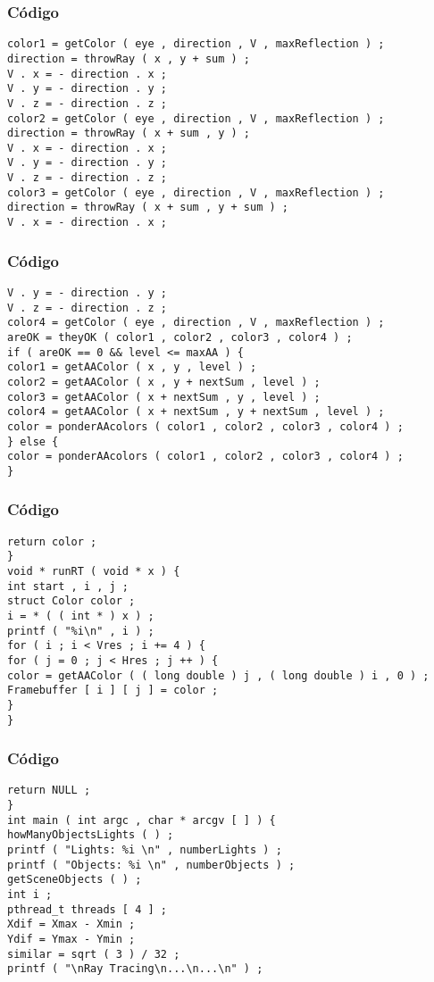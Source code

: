 \documentclass{beamer}
\begin{document}
\begin{frame}[fragile]
\frametitle{C\'odigo}
\begin{verbatim}
color1 = getColor ( eye , direction , V , maxReflection ) ; 
direction = throwRay ( x , y + sum ) ; 
V . x = - direction . x ; 
V . y = - direction . y ; 
V . z = - direction . z ; 
color2 = getColor ( eye , direction , V , maxReflection ) ; 
direction = throwRay ( x + sum , y ) ; 
V . x = - direction . x ; 
V . y = - direction . y ; 
V . z = - direction . z ; 
color3 = getColor ( eye , direction , V , maxReflection ) ; 
direction = throwRay ( x + sum , y + sum ) ; 
V . x = - direction . x ; 
\end{verbatim}
\end{frame}
\begin{frame}[fragile]
\frametitle{C\'odigo}
\begin{verbatim}
V . y = - direction . y ; 
V . z = - direction . z ; 
color4 = getColor ( eye , direction , V , maxReflection ) ; 
areOK = theyOK ( color1 , color2 , color3 , color4 ) ; 
if ( areOK == 0 && level <= maxAA ) { 
color1 = getAAColor ( x , y , level ) ; 
color2 = getAAColor ( x , y + nextSum , level ) ; 
color3 = getAAColor ( x + nextSum , y , level ) ; 
color4 = getAAColor ( x + nextSum , y + nextSum , level ) ; 
color = ponderAAcolors ( color1 , color2 , color3 , color4 ) ; 
} else { 
color = ponderAAcolors ( color1 , color2 , color3 , color4 ) ; 
} 
\end{verbatim}
\end{frame}
\begin{frame}[fragile]
\frametitle{C\'odigo}
\begin{verbatim}
return color ; 
} 
void * runRT ( void * x ) { 
int start , i , j ; 
struct Color color ; 
i = * ( ( int * ) x ) ; 
printf ( "%i\n" , i ) ; 
for ( i ; i < Vres ; i += 4 ) { 
for ( j = 0 ; j < Hres ; j ++ ) { 
color = getAAColor ( ( long double ) j , ( long double ) i , 0 ) ; 
Framebuffer [ i ] [ j ] = color ; 
} 
} 
\end{verbatim}
\end{frame}
\begin{frame}[fragile]
\frametitle{C\'odigo}
\begin{verbatim}
return NULL ; 
} 
int main ( int argc , char * arcgv [ ] ) { 
howManyObjectsLights ( ) ; 
printf ( "Lights: %i \n" , numberLights ) ; 
printf ( "Objects: %i \n" , numberObjects ) ; 
getSceneObjects ( ) ; 
int i ; 
pthread_t threads [ 4 ] ; 
Xdif = Xmax - Xmin ; 
Ydif = Ymax - Ymin ; 
similar = sqrt ( 3 ) / 32 ; 
printf ( "\nRay Tracing\n...\n...\n" ) ; 
\end{verbatim}
\end{frame}
\end{document}
